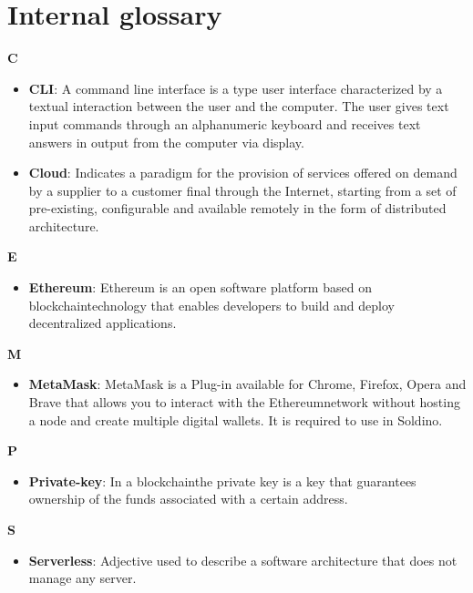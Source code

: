 \section{Internal glossary}
\textbf{C}
\begin{itemize}
	\item \textbf{CLI}: A command line interface is a type user interface characterized by a textual interaction between the user and the computer. The user gives text input commands through an alphanumeric keyboard and receives text answers in output from the computer via display.
	\item \textbf{Cloud}: Indicates a paradigm for the provision of services offered on demand by a supplier to a customer
	final through the Internet, starting from a set of pre-existing, configurable and
	available remotely in the form of distributed architecture.
\end{itemize}
\textbf{E}
\begin{itemize}
	\item \textbf{Ethereum}: Ethereum is an open software platform based on blockchain\glo technology that enables developers to build and deploy decentralized applications.
\end{itemize}
\textbf{M}
\begin{itemize}
	\item \textbf{MetaMask}: MetaMask is a Plug-in available for Chrome, Firefox, Opera and Brave that allows you to interact with the Ethereum\glo network without hosting a node and create multiple digital wallets. It is required to use in Soldino.
\end{itemize}
\textbf{P}
\begin{itemize}
	\item \textbf{Private-key}: In a blockchain\glo the private key is a key that guarantees ownership of the funds associated with
	a certain address.
\end{itemize}
\textbf{S}
\begin{itemize}
	\item \textbf{Serverless}: Adjective used to describe a software architecture that does not manage any server.
\end{itemize}
